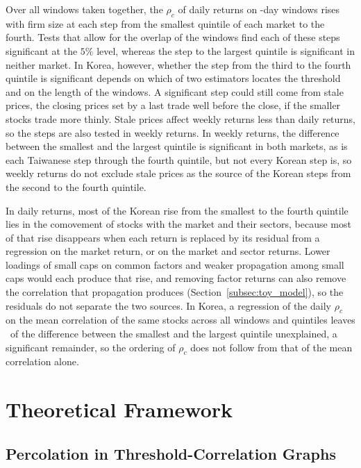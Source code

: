 \documentclass[a4paper,fleqn]{cas-sc}
\begin{document}
Over all windows taken together, the $\rho_c$ of daily returns on \paperWindowDays-day windows rises with firm size at each step from the smallest quintile of each market to the fourth. Tests that allow for the overlap of the windows find each of these steps significant at the $5\%$ level, whereas the step to the largest quintile is significant in neither market. In Korea, however, whether the step from the third to the fourth quintile is significant depends on which of two estimators locates the threshold and on the length of the windows. A significant step could still come from stale prices, the closing prices set by a last trade well before the close, if the smaller stocks trade more thinly. Stale prices affect weekly returns less than daily returns, so the steps are also tested in weekly returns. In weekly returns, the difference between the smallest and the largest quintile is significant in both markets, as is each Taiwanese step through the fourth quintile, but not every Korean step is, so weekly returns do not exclude stale prices as the source of the Korean steps from the second to the fourth quintile.

In daily returns, most of the Korean rise from the smallest to the fourth quintile lies in the comovement of stocks with the market and their sectors, because most of that rise disappears when each return is replaced by its residual from a regression on the market return, or on the market and sector returns. Lower loadings of small caps on common factors and weaker propagation among small caps would each produce that rise, and removing factor returns can also remove the correlation that propagation produces (Section~\ref{subsec:toy_model}), so the residuals do not separate the two sources. In Korea, a regression of the daily $\rho_c$ on the mean correlation of the same stocks across all windows and quintiles leaves \rhoCResidGapPctOfRaw\ of the difference between the smallest and the largest quintile unexplained, a significant remainder, so the ordering of $\rho_c$ does not follow from that of the mean correlation alone.

\section{Theoretical Framework}\label{sec:framework}

\subsection{Percolation in Threshold-Correlation Graphs}\label{subsec:percolation_definition}
\end{document}
